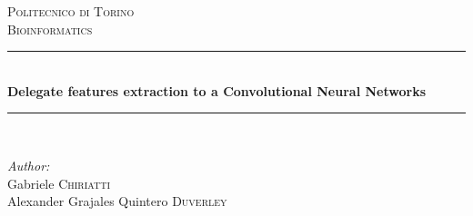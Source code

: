 \documentclass[12pt]{article} %
\begin{document}

\begin{titlepage}

\newcommand{\HRule}{\rule{\linewidth}{0.5mm}} %

\center %



\textsc{\LARGE Politecnico di Torino}\\[1cm] %
\textsc{\Large   Bioinformatics                           }\\[0.3cm] %

\HRule \\[0.5cm]
{ \huge  \bfseries Delegate features extraction to a Convolutional Neural Networks}\\[0.3cm] %
\HRule \\[0.5cm]

\begin{figure}[H] %
 \end{figure}

\begin{minipage}{0.8\textwidth}
\begin{flushleft} \large
\emph{Author:}\\
Gabriele \textsc{Chiriatti}\\
 Alexander Grajales Quintero \textsc{Duverley}\\
\end{flushleft}
\end{minipage}
~
\begin{minipage}{0.4\textwidth}
\begin{flushright} \large
\end{flushright}
\end{minipage}\\[1.9cm]


\end{titlepage}
\end{document}
